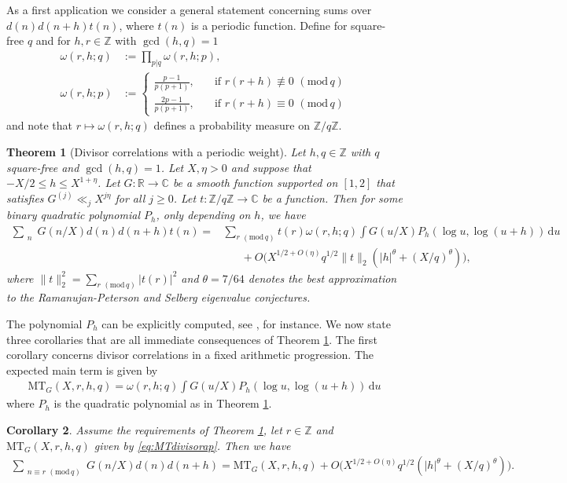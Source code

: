 \documentclass[12pt]{amsart}
\newtheorem{theorem}{Theorem}[section]
\newtheorem{corollary}[theorem]{Corollary}
\theoremstyle{definition}
\theoremstyle{remark}
\numberwithin{equation}{section}
\newcommand{\C}{{\mathbb C}}
\newcommand{\R}{{\mathbb R}}
\newcommand{\Z}{{\mathbb Z}}
\newcommand{\1}{{\mathbf 1}}
\renewcommand{\d}{\mathrm d}
\renewcommand{\pmod}[1]{\,\,(\mathrm{mod}\,{#1})}
\begin{document}
As a first application we consider a general statement concerning sums over $d(n)d(n+h)t(n)$, where $t(n)$ is a periodic function. Define for square-free $q$ and for $h,r\in \Z$  with $\gcd(h,q)=1$
\begin{align*}
    \omega(r,h;q) &:= \prod_{p| q}  \omega(r,h;p), \\
        \omega(r,h;p) &:= \begin{cases}
        \frac{p-1}{p(p+1)}, \quad  &\text{if } r(r+h) \not \equiv
        0 \pmod{q} \\
           \frac{2p-1}{p(p+1)}, \quad  &\text{if }  r(r+h) \equiv
        0 \pmod{q}
    \end{cases}
\end{align*}
and note that $r\mapsto   \omega(r,h;q)$ defines a probability measure on $\Z/q\Z$.
\begin{theorem}[Divisor correlations with a periodic weight] \label{thm:divisorperiodic}
    Let $h,q\in \Z$ with $q$ square-free and $\gcd(h,q)=1$. Let $X,\eta > 0$ and suppose that $-X/2\leq h  \leq X^{1+\eta}$.  Let $G:\R\to\C$ be a smooth  function supported on $[1,2]$ that satisfies $G^{(j)} \ll_j X^{j \eta }$ for all $j \geq 0$. Let $t:\Z/q\Z \to \C$ be a function. Then for some binary quadratic polynomial $P_h$, only depending on $h$, we have
    \begin{align*}
        \sum_{\substack{ n }} G(n/X) d(n) d(n+h)t(n) =&\sum_{r\pmod{q}} t(r)\omega(r,h;q) \int G(u/X)  P_h( \log u,\log(u+h)) \,\d u
        \\
        &\hspace{20pt}+O\bigg( X^{1/2+O(\eta)} q^{1/2}\|t\|_2   (|h|^{\theta}+(X/q)^{\theta})  \bigg),
    \end{align*}
where  $\|t\|_2^2 = \sum_{r \pmod{q}} |t(r)|^2$ and $\theta= 7/64$ denotes the best approximation to the Ramanujan-Peterson and Selberg eigenvalue conjectures.
\end{theorem}
The polynomial $P_h$ can be explicitly computed, see \cite{Motohashidivisor}, for instance. We now state three corollaries that are all immediate consequences of Theorem \ref{thm:divisorperiodic}. The first corollary concerns divisor correlations in a fixed arithmetic progression. The expected main term is given by
\begin{align}\label{eq:MTdivisorap}
    \mathrm{MT}_G(X,r,h,q)= \omega(r,h;q) \int G(u/X) P_h( \log u,\log(u+h)) \,\d u
\end{align}
where $P_h$ is the quadratic polynomial as in Theorem \ref{thm:divisorperiodic}.
\begin{corollary} \label{cor:fixedap}
Assume the requirements of Theorem \ref{thm:divisorperiodic}, let $r\in \Z$ and $\mathrm{MT}_G(X,r,h,q)$ given by \eqref{eq:MTdivisorap}. Then we have
    \begin{align*}
        \sum_{\substack{ n\equiv r \pmod{q}}} G(n/X) d(n) d(n+h)=  \mathrm{MT}_G(X,r,h,q)+ O\bigg( X^{1/2+O(\eta)} q^{1/2}  (|h|^{\theta}+(X/q)^{\theta})  \bigg).
    \end{align*}
\end{corollary}
\end{document}
